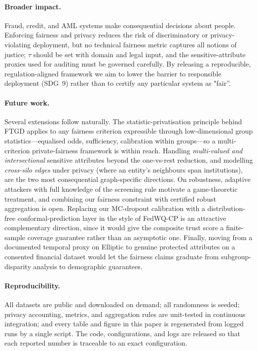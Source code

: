 \documentclass[pdflatex,sn-mathphys-num]{sn-jnl}
\theoremstyle{thmstyleone}%
\theoremstyle{thmstyletwo}%
\theoremstyle{thmstylethree}%
\begin{document}
\paragraph{Broader impact.}
Fraud, credit, and AML systems make consequential decisions about people.
Enforcing fairness and privacy reduces the risk of discriminatory or
privacy-violating deployment, but no technical fairness metric captures all
notions of justice; $\tau$ should be set with domain and legal input, and the
sensitive-attribute proxies used for auditing must be governed carefully. By
releasing a reproducible, regulation-aligned framework we aim to lower the
barrier to responsible deployment (SDG~9) rather than to certify any particular
system as "fair''.

\paragraph{Future work.}
Several extensions follow naturally. The statistic-privatisation principle
behind FTGD applies to any fairness criterion expressible through
low-dimensional group statistics---equalised odds, sufficiency, calibration
within groups---so a multi-criterion private-fairness framework is within reach.
Handling \emph{multi-valued and intersectional} sensitive attributes beyond the
one-vs-rest reduction, and modelling \emph{cross-silo edges} under privacy
(where an entity's neighbours span institutions), are the two most consequential
graph-specific directions. On robustness, adaptive attackers with full knowledge
of the screening rule motivate a game-theoretic treatment, and combining our
fairness constraint with certified robust aggregation is open. Replacing our
MC-dropout calibration with a distribution-free conformal-prediction layer in
the style of FedWQ-CP \cite{nguyen2026conformal} is an attractive
complementary direction, since it would give the composite trust score a
finite-sample coverage guarantee rather than an asymptotic one. Finally,
moving from a documented temporal proxy on Elliptic to genuine protected
attributes on a consented financial dataset would let the fairness claims
graduate from subgroup-disparity analysis to demographic guarantees.

\paragraph{Reproducibility.}
All datasets are public and downloaded on demand; all randomness is seeded;
privacy accounting, metrics, and aggregation rules are unit-tested in continuous
integration; and every table and figure in this paper is regenerated from logged
runs by a single script. The code, configurations, and logs are released so that
each reported number is traceable to an exact configuration.
\end{document}
